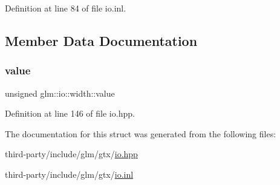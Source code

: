 Definition at line 84 of file io.\+inl.



\subsection{Member Data Documentation}
\mbox{\label{structglm_1_1io_1_1width_a6bf1338eb947811d36ec93bd2e9b8425}} 
\subsubsection{\texorpdfstring{value}{value}}
{\footnotesize\ttfamily unsigned glm\+::io\+::width\+::value}



Definition at line 146 of file io.\+hpp.



The documentation for this struct was generated from the following files\+:\begin{DoxyCompactItemize}
\item 
third-\/party/include/glm/gtx/\hyperlink{io_8hpp}{io.\+hpp}\item 
third-\/party/include/glm/gtx/\hyperlink{io_8inl}{io.\+inl}\end{DoxyCompactItemize}
